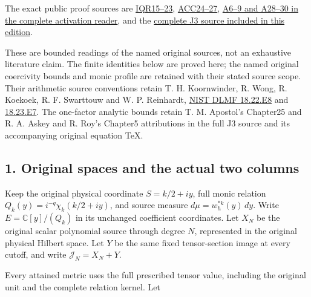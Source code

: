\documentclass[11pt]{article}
\begin{document}
The exact public proof sources are \href{https://github.com/KokunoYumeto/zeta-function-research-reader/blob/ab120cf974feb26a31d77b07458b6da52f912ea4/workbenches/splitzero-tandem/continuations/20260921-inverse-quotient/INVERSE_QUOTIENT_RECEIVERS.tex}{IQR15--23}, \href{https://github.com/KokunoYumeto/zeta-function-research-reader/blob/7230c00b9f07dd222b2aea95427d67918f3a8cac/workbenches/splitzero-tandem/continuations/20260921-local-covariance-activation/010/ORIGINAL_ADJACENT_CUTOFF_CURRENT.tex}{ACC24--27}, \href{https://github.com/KokunoYumeto/zeta-function-research-reader/blob/7230c00b9f07dd222b2aea95427d67918f3a8cac/workbenches/splitzero-tandem/continuations/20260921-local-covariance-activation/010/COMPLETE_ACTIVATION_AND_NATIVE_READER.tex}{A6--9 and A28--30 in the complete activation reader}, and the \href{https://github.com/KokunoYumeto/zeta-function-research-reader/blob/main/workbenches/splitzero-tandem/continuations/20260921-uniform-source-family/JOINT_MINIMUM_COMPLETE.tex\#L634}{complete J3 source included in this edition}.

These are bounded readings of the named original sources, not an exhaustive literature claim. The finite identities below are proved here; the named original coercivity bounds and monic profile are retained with their stated source scope. Their arithmetic source conventions retain T. H. Koornwinder, R. Wong, R. Koekoek, R. F. Swarttouw and W. P. Reinhardt, \href{https://dlmf.nist.gov/18.22.E8}{NIST DLMF 18.22.E8} and \href{https://dlmf.nist.gov/18.23.E7}{18.23.E7}. The one-factor analytic bounds retain T. M. Apostol's Chapter25 and R. A. Askey and R. Roy's Chapter5 attributions in the full J3 source and its accompanying original equation TeX.

\subsection{1. Original spaces and the actual two columns}\label{original-spaces-and-the-actual-two-columns}

Keep the original physical coordinate \(S=k/2+iy\), full monic relation \(Q_k(y)=i^{-q}\chi_k(k/2+iy)\), and source measure \(d\mu=w_h^{*k}(y)\,dy\). Write \(E=\mathbb C[y]/(Q_k)\) in its unchanged coefficient coordinates. Let \(X_N\) be the original scalar polynomial source through degree \(N\), represented in the original physical Hilbert space. Let \(Y\) be the same fixed tensor-section image at every cutoff, and write \(\mathcal J_N=X_N+Y\).

Every attained metric uses the full prescribed tensor value, including the original unit and the complete relation kernel. Let
\end{document}
